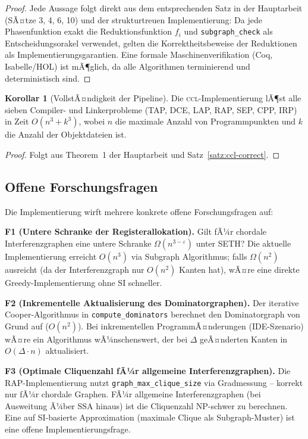 ﻿\documentclass[a4paper,12pt]{article}
\theoremstyle{definition}
\newtheorem{korollar}{Korollar}
\begin{document}
\begin{proof}
	Jede Aussage folgt direkt aus dem entsprechenden Satz in der Hauptarbeit
	(SÃ¤tze 3, 4, 6, 10) und der strukturtreuen Implementierung: Da jede
	Phasenfunktion exakt die Reduktionsfunktion $f_i$ und
	\texttt{subgraph\_check} als Entscheidungsorakel verwendet, gelten die
	Korrektheitsbeweise der Reduktionen als Implementierungsgarantien.
	Eine formale Maschinenverifikation (Coq, Isabelle/HOL) ist mÃ¶glich,
	da alle Algorithmen terminierend und deterministisch sind.
\end{proof}

\begin{korollar}[VollstÃ¤ndigkeit der Pipeline]
	\label{kor:vollst}
	Die \textsc{ccl}-Implementierung lÃ¶st alle sieben Compiler- und
	Linkerprobleme (TAP, DCE, LAP, RAP, SEP, CPP, IRP) in Zeit
	$O(n^3 + k^3)$, wobei $n$ die maximale Anzahl von Programmpunkten
	und $k$ die Anzahl der Objektdateien ist.
\end{korollar}

\begin{proof}
	Folgt aus Theorem~1 der Hauptarbeit und Satz~\ref{satz:ccl-correct}.
\end{proof}

\subsection{Offene Forschungsfragen}
\label{sec:ausblick-offen}

Die Implementierung wirft mehrere konkrete offene Forschungsfragen auf:

\textbf{F1 (Untere Schranke der Registerallokation).}
Gilt fÃ¼r chordale Interferenzgraphen eine untere Schranke
$\Omega(n^{3-\varepsilon})$ unter SETH? Die aktuelle Implementierung
erreicht $O(n^3)$ via Subgraph Algorithmus; falls $\Omega(n^2)$
ausreicht (da der Interferenzgraph nur $O(n^2)$ Kanten hat), wÃ¤re
eine direkte Greedy-Implementierung ohne SI schneller.

\textbf{F2 (Inkrementelle Aktualisierung des Dominatorgraphen).}
Der iterative Cooper-Algorithmus in \texttt{compute\_dominators}
berechnet den Dominatorgraph von Grund auf ($O(n^2)$). Bei
inkrementellen ProgrammÃ¤nderungen (IDE-Szenario) wÃ¤re ein
Algorithmus wÃ¼nschenswert, der bei $\Delta$ geÃ¤nderten Kanten
in $O(\Delta \cdot n)$ aktualisiert.

\textbf{F3 (Optimale Cliquenzahl fÃ¼r allgemeine Interferenzgraphen).}
Die RAP-Implementierung nutzt \texttt{graph\_max\_clique\_size}
via Gradmessung -- korrekt nur fÃ¼r chordale Graphen. FÃ¼r
allgemeine Interferenzgraphen (bei Ausweitung Ã¼ber SSA hinaus)
ist die Cliquenzahl NP-schwer zu berechnen. Eine auf SI-basierte
Approximation (maximale Clique als Subgraph-Muster) ist eine
offene Implementierungsfrage.
\end{document}
